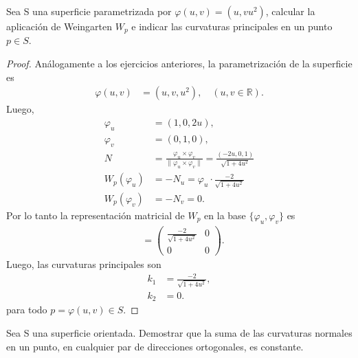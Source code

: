 \documentclass{article}
\newcommand{\R}{\mathbb{R}}
\newenvironment{theorem}[2][Ejercicio]{\begin{trivlist}
\item[\hskip \labelsep {\bfseries #1}\hskip \labelsep {\bfseries #2.}]}{\end{trivlist}}
\begin{document}
\begin{theorem}{7}
    Sea S una superficie parametrizada por \( \varphi(u, v) = (u, v u^2) \), calcular la aplicación de Weingarten \( W_p \) e indicar las curvaturas principales en un punto \( p \in S \).
\end{theorem}

\begin{proof}
    Análogamente a los ejercicios anteriores, la parametrización de la superficie es \begin{align*}
        \varphi(u, v) & = (u, v, u^2), \quad (u, v \in \R).
    \end{align*}
    Luego, \begin{align*}
        \varphi_u      & = (1, 0, 2u),                                                                                             \\
        \varphi_v      & = (0, 1, 0),                                                                                              \\
        N              & = \frac{\varphi_u \times \varphi_v}{\|\varphi_u \times \varphi_v\|} = \frac{(-2u, 0, 1)}{\sqrt{1 + 4u^2}} \\
        W_p(\varphi_u) & = -N_u = \varphi_u \cdot \frac{-2}{\sqrt{1 + 4u^2}}                                                       \\
        W_p(\varphi_v) & = -N_v = 0.
    \end{align*}
    Por lo tanto la representación matricial de \( W_p \) en la base \( \{\varphi_u, \varphi_v\} \) es \begin{align*}
        [W_p] & = \begin{pmatrix}
                      \frac{-2}{\sqrt{1 + 4u^2}} & 0 \\
                      0                          & 0
                  \end{pmatrix}.
    \end{align*}
    Luego, las curvaturas principales son \begin{align*}
        k_1 & = \frac{-2}{\sqrt{1 + 4u^2}}, \\
        k_2 & = 0.
    \end{align*}
    para todo \( p = \varphi(u, v) \in S \).
\end{proof}

\begin{theorem}{8}
    Sea S una superficie orientada. Demostrar que la suma de las curvaturas normales en un punto, en cualquier par de direcciones ortogonales, es constante.
\end{theorem}
\end{document}
